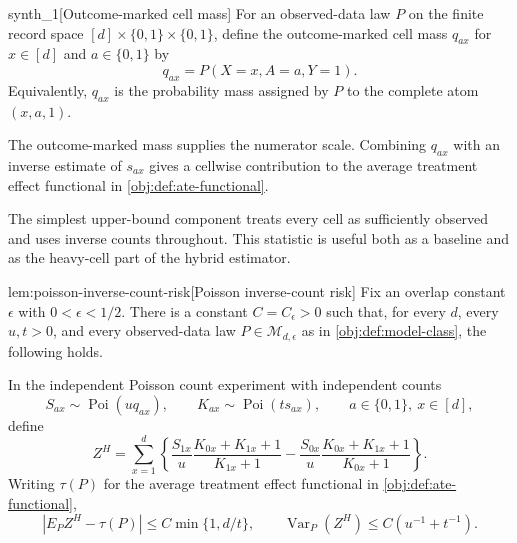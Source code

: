 \documentclass[11pt]{article}
\begin{document}
\begin{definitionv}{synth_1}[Outcome-marked cell mass]
For an observed-data law \(P\) on the finite record space \([d]\times\{0,1\}\times\{0,1\}\), define the outcome-marked cell mass \(q_{ax}\) for \(x\in[d]\) and \(a\in\{0,1\}\) by
\[
q_{ax}
=
P(X=x,A=a,Y=1).
\]
Equivalently, \(q_{ax}\) is the probability mass assigned by \(P\) to the complete atom \((x,a,1)\).
\end{definitionv}

The outcome-marked mass  supplies the numerator scale. Combining \(q_{ax}\) with an inverse estimate of \(s_{ax}\) gives a cellwise contribution to the average treatment effect functional in \cref{obj:def:ate-functional}.

The simplest upper-bound component treats every cell as sufficiently observed and uses inverse counts throughout. This statistic is useful both as a baseline and as the heavy-cell part of the hybrid estimator.

\begin{lemmav}{lem:poisson-inverse-count-risk}[Poisson inverse-count risk]
Fix an overlap constant \(\epsilon\) with \(0<\epsilon<1/2\).  There is a constant \(C=C_\epsilon>0\) such that, for every \(d\), every \(u,t>0\), and every observed-data law \(P\in\mathcal M_{d,\epsilon}\) as in \cref{obj:def:model-class}, the following holds.

In the independent Poisson count experiment with independent counts
\[
S_{ax}\sim \operatorname{Poi}(u q_{ax}),
\qquad
K_{ax}\sim \operatorname{Poi}(t s_{ax}),
\qquad a\in\{0,1\},\ x\in[d],
\]
define
\[
Z^H
=
\sum_{x=1}^d
\left\{
\frac{S_{1x}}{u}\frac{K_{0x}+K_{1x}+1}{K_{1x}+1}
-
\frac{S_{0x}}{u}\frac{K_{0x}+K_{1x}+1}{K_{0x}+1}
\right\}.
\]
Writing \(\tau(P)\) for the average treatment effect functional in \cref{obj:def:ate-functional},
\[
\left|E_P Z^H-\tau(P)\right|
\le
C\min\{1,d/t\},
\qquad
\operatorname{Var}_P(Z^H)
\le
C\left(u^{-1}+t^{-1}\right).
\]
\end{lemmav}
\end{document}
